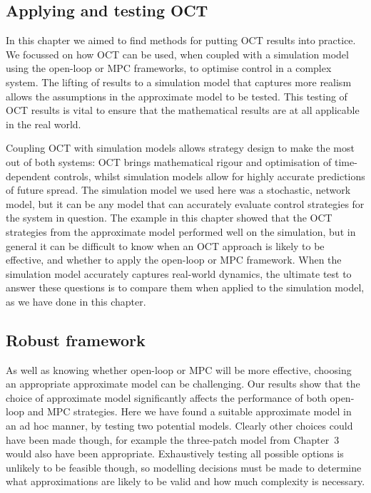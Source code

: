 \subsection{Applying and testing OCT}

In this chapter we aimed to find methods for putting OCT results into practice. We focussed on how OCT can be used, when coupled with a simulation model using the open-loop or MPC frameworks, to optimise control in a complex system. The lifting of results to a simulation model that captures more realism allows the assumptions in the approximate model to be tested. This testing of OCT results is vital to ensure that the mathematical results are at all applicable in the real world.

Coupling OCT with simulation models allows strategy design to make the most out of both systems: OCT brings mathematical rigour and optimisation of time-dependent controls, whilst simulation models allow for highly accurate predictions of future spread. The simulation model we used here was a stochastic, network model, but it can be any model that can accurately evaluate control strategies for the system in question. The example in this chapter showed that the OCT strategies from the approximate model performed well on the simulation, but in general it can be difficult to know when an OCT approach is likely to be effective, and whether to apply the open-loop or MPC framework. When the simulation model accurately captures real-world dynamics, the ultimate test to answer these questions is to compare them when applied to the simulation model, as we have done in this chapter.

\subsection{Robust framework}

As well as knowing whether open-loop or MPC will be more effective, choosing an appropriate approximate model can be challenging. Our results show that the choice of approximate model significantly affects the performance of both open-loop and MPC strategies. Here we have found a suitable approximate model in an ad hoc manner, by testing two potential models. Clearly other choices could have been made though, for example the three-patch model from Chapter~3 would also have been appropriate. Exhaustively testing all possible options is unlikely to be feasible though, so modelling decisions must be made to determine what approximations are likely to be valid and how much complexity is necessary.

